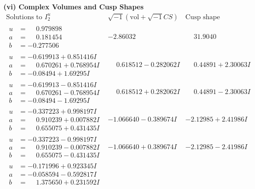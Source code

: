 \documentclass[1p]{elsarticle_modified}
\theoremstyle{definition}
\newcommand{\I}{\sqrt{-1}}
\begin{document}
\newpage\flushleft \textbf{(vi) Complex Volumes and Cusp Shapes}
$$\begin{array}{c|c|c}  
\text{Solutions to }I^u_{2}& \I (\text{vol} + \sqrt{-1}CS) & \text{Cusp shape}\\
 \hline 
\begin{aligned}
u &= \phantom{-}0.979898\phantom{ +0.000000I} \\
a &= \phantom{-}0.181454\phantom{ +0.000000I} \\
b &= -0.277506\phantom{ +0.000000I}\end{aligned}
 & -2.86032\phantom{ +0.000000I} & \phantom{-}31.9040\phantom{ +0.000000I} \\ \hline\begin{aligned}
u &= -0.619913 + 0.851416 I \\
a &= \phantom{-}0.670261 + 0.768954 I \\
b &= -0.08494 + 1.69295 I\end{aligned}
 & \phantom{-}0.618512 - 0.282062 I & \phantom{-}0.44891 + 2.30063 I \\ \hline\begin{aligned}
u &= -0.619913 - 0.851416 I \\
a &= \phantom{-}0.670261 - 0.768954 I \\
b &= -0.08494 - 1.69295 I\end{aligned}
 & \phantom{-}0.618512 + 0.282062 I & \phantom{-}0.44891 - 2.30063 I \\ \hline\begin{aligned}
u &= -0.337223 + 0.998197 I \\
a &= \phantom{-}0.910239 + 0.007882 I \\
b &= \phantom{-}0.655075 + 0.431435 I\end{aligned}
 & -1.066640 - 0.389674 I & -2.12985 + 2.41986 I \\ \hline\begin{aligned}
u &= -0.337223 - 0.998197 I \\
a &= \phantom{-}0.910239 - 0.007882 I \\
b &= \phantom{-}0.655075 - 0.431435 I\end{aligned}
 & -1.066640 + 0.389674 I & -2.12985 - 2.41986 I \\ \hline\begin{aligned}
u &= -0.171996 + 0.923345 I \\
a &= -0.058594 - 0.592817 I \\
b &= \phantom{-}1.375650 + 0.231592 I\end{aligned}

\end{array}$$
\end{document}
